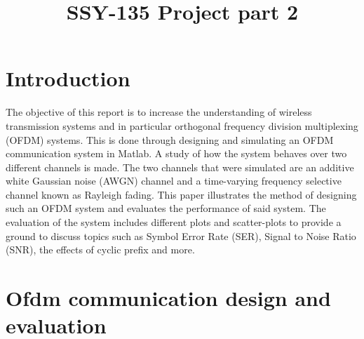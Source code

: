 \documentclass[conference]{IEEEtran}
\begin{document}
\thispagestyle{fancy}
\cfoot{}
\renewcommand{\headrulewidth}{0pt}
\renewcommand{\footrulewidth}{0pt}
\pagestyle{fancy}
\rfoot{\thepage}
\title{SSY-135 Project part 2}


\author{
\and
{}
\and
{}
\and
{}
\and
{}
}

\maketitle

\section{Introduction}

The objective of this report is to increase the understanding of wireless transmission systems and in particular orthogonal frequency division multiplexing (OFDM) systems. This is done through designing and simulating an OFDM communication system in Matlab. A study of how the system behaves over two different channels is made. The two channels that were simulated are an additive white Gaussian noise (AWGN) channel and a time-varying frequency selective channel known as Rayleigh fading. This paper illustrates the method of designing such an OFDM system and evaluates the performance of said system. The evaluation of the system includes different plots and scatter-plots to provide a ground to discuss topics such as Symbol Error Rate (SER), Signal to Noise Ratio (SNR), the effects of cyclic prefix and more.




\section{Ofdm communication design and evaluation}
\end{document}
